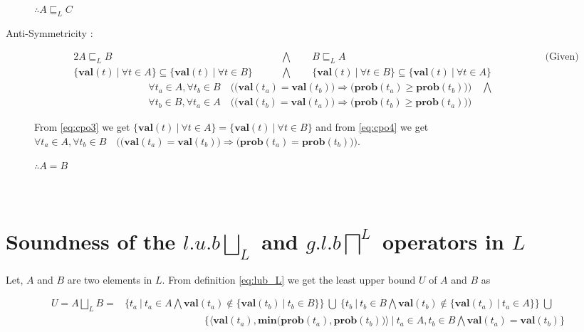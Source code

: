 \documentclass[final,3p, review, times]{util/elsarticle}
\begin{document}
\begin{description}
	$\therefore A\sqsubseteq_L C$
\item[Anti-Symmetricity :] \hfill
\begin{alignat}{2}
    A\sqsubseteq_L B &\qquad\bigwedge\qquad B\sqsubseteq_L A\qquad\qquad\qquad\qquad\qquad\qquad\qquad\qquad\qquad\qquad\text{(Given)}\nonumber\\
    \Big\{\mathbf{val}(t)\ \big|\ \forall t\in A\Big\}\subseteq\Big\{\mathbf{val}(t)\ \big|\ \forall t\in B\Big\} &\qquad\bigwedge\qquad \Big\{\mathbf{val}(t)\ \big|\ \forall t\in B\Big\}\subseteq\Big\{\mathbf{val}(t)\ \big|\ \forall t\in A\Big\}\label{eq:cpo3}
\end{alignat}
\begin{align}
	\forall t_a\in A,\forall t_b\in B\quad\bigg(\Big(\mathbf{val}(t_a)=\mathbf{val}(t_b)\Big)\Rightarrow\Big(\mathbf{prob}(t_a)\geq\mathbf{prob}(t_b)\Big)\bigg)\quad\bigwedge\nonumber\\
	\forall t_b\in B,\forall t_a\in A\quad\bigg(\Big(\mathbf{val}(t_b)=\mathbf{val}(t_a)\Big)\Rightarrow\Big(\mathbf{prob}(t_b)\geq\mathbf{prob}(t_a)\Big)\bigg)\qquad\ \ &\label{eq:cpo4}
\end{align}

	From \ref{eq:cpo3} we get $\Big\{\mathbf{val}(t)\ \big|\ \forall t\in A\Big\}=\Big\{\mathbf{val}(t)\ \big|\ \forall t\in B\Big\}$ and from \ref{eq:cpo4} we get\\
\noindent$\forall t_a\in A,\forall t_b\in B\quad\bigg(\Big(\mathbf{val}(t_a)=\mathbf{val}(t_b)\Big)\Rightarrow\Big(\mathbf{prob}(t_a)=\mathbf{prob}(t_b)\Big)\bigg)$.
	
	$\therefore A=B$
\end{description}









\section{\\Soundness of the $l.u.b \displaystyle\bigsqcup_L$ and $g.l.b \displaystyle\bigsqcap^L$ operators in $L$}
\label{app:concrete_ub}

Let, $A$ and $B$ are two elements in $L$. From definition \ref{eq:lub_L} we get the least upper bound $U$ of $A$ and $B$ as

\begin{align}
U=A\bigsqcup_L B=&\Big\{t_a\ \big|\  t_a\in A\bigwedge \mathbf{val}(t_a)\notin \big\{\mathbf{val}(t_b)\ |\ t_b\in B\big\}\Big\}\ \bigcup\ \Big\{t_b\ \big|\  t_b\in B\bigwedge \mathbf{val}(t_b)\notin \big\{\mathbf{val}(t_a)\ |\ t_a\in A\big\}\Big\}\ \bigcup&\nonumber\\
    &\qquad\qquad\qquad\qquad\Big\{\big\langle\mathbf{val}(t_a),\mathbf{min}\big(\mathbf{prob}(t_a),\mathbf{prob}(t_b)\big)\big\rangle\ \big|\  t_a\in A, t_b\in B\bigwedge \mathbf{val}(t_a)=\mathbf{val}(t_b)\Big\}\label{eq:ub_L1}&
\end{align}
\end{document}
